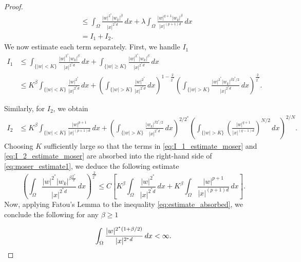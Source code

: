\documentclass[11pt]{article}
\newcommand{\om} {\Omega}
\begin{document}
\begin{proof}
\begin{equation}
\begin{aligned}
&\leq \int_\Omega \frac{|w|^{2^*} |w_k|^\beta}{|x|^{2^* d}} \, dx 
+ \lambda \int_\Omega \frac{|w|^{q+1} |w_k|^\beta}{|x|^{(p+1)d}}\, dx \\
&= I_1 + I_2.
\end{aligned}
\end{equation}
We now estimate each term separately. First, we handle \( I_1 \)
\begin{equation}\label{eq:I_1_estimate_moser}
\begin{aligned}
I_1 &\leq \int_{\{|w| < K\}} \frac{|w|^{2^*} |w_k|^\beta}{|x|^{2^* d}} \, dx 
+ \int_{\{|w| \geq K\}} \frac{|w|^{2^*} |w_k|^\beta}{|x|^{2^*d}} \, dx \\
&\leq K^\beta \int_{\{|w| < K\}} \frac{|w|^{2^*}}{|x|^{2^* d}} \, dx 
+ \left( \int_{\{|w| > K\}} \frac{|w|^{2^*}}{|x|^{2^* d}} \, dx \right)^{1 - \frac{2}{2^*}} 
\left( \int_{\{|w| > K\}} \frac{|w|^{2^*}|w_k|^{\beta 2^*/2}}{|x|^{2^* d}} \, dx \right)^{\frac{2}{2^*}}.
\end{aligned}
\end{equation}

Similarly, for \( I_2 \), we obtain
\begin{equation}\label{eq:I_2_estimate_moser}
\begin{aligned}
I_2 &\leq K^\beta \int_{\{|w| < K\}} \frac{|w|^{p + 1}}{|x|^{(p+1)d}} \, dx 
+ \left( \int_{\{|w| > K\}} \frac{|w_k|^{\beta 2^*/2}}{|x|^{2^* d}} \, dx \right)^{2/2^*}
\left( \int_{\{|w| > K\}} \left(\frac{|w|^{q + 1}}{|x|^{(q-1)d}} \right)^{N/2} \, dx \right)^{2/N}.
\end{aligned}
\end{equation}
Choosing \( K \) sufficiently large so that the terms in \eqref{eq:I_1_estimate_moser} and \eqref{eq:I_2_estimate_moser} are absorbed into the right-hand side of \eqref{eq:moser_estimate1}, we deduce the following estimate
\begin{equation}
\left( \int_{\Omega} \frac{|w|^{2^*} |w_k|^{\beta \frac{2^*}{2}}}{|x|^{2^* d}} \, dx \right)^{\frac{2}{2^*}}
\leq 
C \left[
K^\beta \int_{\Omega} \frac{|w|^{2^*}}{|x|^{2^* d}} \, dx 
+ K^\beta \int_{\om} \frac{|w|^{p + 1}}{|x|^{(p+1)d}} \, dx 
\right].
\label{eq:estimate_absorbed}
\end{equation}
Now, applying Fatou's Lemma to the inequality \eqref{eq:estimate_absorbed}, we conclude the following for any \( \beta \geq 1 \)

\begin{equation*}
\int_{\Omega} \frac{|w|^{2^*(1 + \beta/2)}}{|x|^{2^* d}} \, dx < \infty. \qedhere
\end{equation*}
\end{proof}
\end{document}
